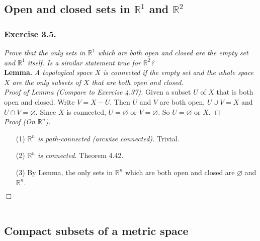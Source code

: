 \documentclass{article}
\begin{document}
\subsection*{Open and closed sets in $\mathbb{R}^1$ and $\mathbb{R}^2$}



\subsubsection*{Exercise 3.5.}
\emph{Prove that the only sets in $\mathbb{R}^1$ which are both open and closed
are the empty set and $\mathbb{R}^1$ itself.
Is a similar statement true for $\mathbb{R}^2$?} \\

\textbf{Lemma.}
\emph{A topological space $X$ is connected if the empty set
and the whole space $X$ are the only subsets of $X$ that are both open and
closed.} \\

\emph{Proof of Lemma (Compare to Exercise 4.37).}
Given a subset $U$ of $X$ that is both open and closed.
Write $V = X-U$.
Then $U$ and $V$ are both open, $U \cup V = X$ and $U \cap V = \varnothing$.
Since $X$ is connected, $U = \varnothing$ or $V = \varnothing$.
So $U = \varnothing$ or $X$.
$\Box$ \\

\emph{Proof (On $\mathbb{R}^n$).}
\begin{enumerate}
\item[(1)]
\emph{$\mathbb{R}^n$ is path-connected (arcwise connected).}
Trivial.
\item[(2)]
\emph{$\mathbb{R}^n$ is connected.}
Theorem 4.42.
\item[(3)]
By Lemma, the only sets in $\mathbb{R}^n$ which are both open and closed
are $\varnothing$ and $\mathbb{R}^n$.
\end{enumerate}
$\Box$ \\\\






\subsection*{Compact subsets of a metric space}
\end{document}
